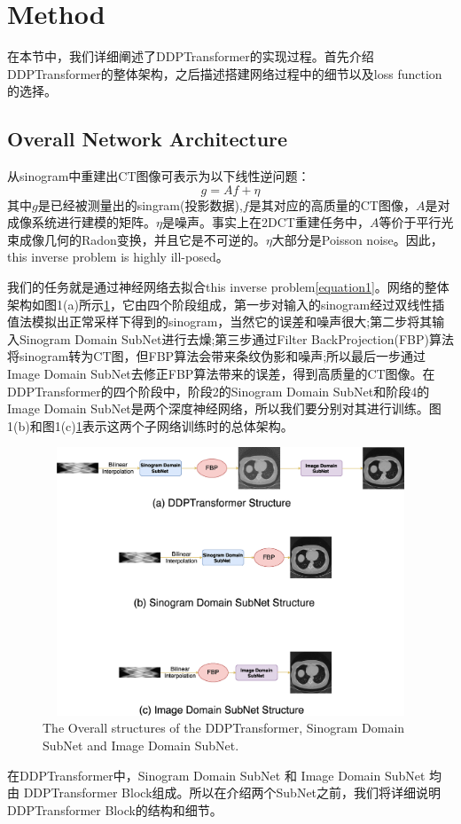 \section{Method}
在本节中，我们详细阐述了DDPTransformer的实现过程。首先介绍DDPTransformer的整体架构，之后描述搭建网络过程中的细节以及loss function的选择。
\subsection{Overall Network Architecture}
从sinogram中重建出CT图像可表示为以下线性逆问题：
\begin{equation}
	\label{equation1}
	g = Af+\eta
\end{equation}
其中$g$是已经被测量出的singram(投影数据),$f$是其对应的高质量的CT图像，$A$是对成像系统进行建模的矩阵。$\eta$是噪声。事实上在2DCT重建任务中，$A$等价于平行光束成像几何的Radon变换，并且它是不可逆的。$\eta$大部分是Poisson noise。因此，this inverse problem is highly ill-posed。\par
我们的任务就是通过神经网络去拟合this inverse problem\ref{equation1}。网络的整体架构如图1(a)所示\ref{fig1}，它由四个阶段组成，第一步对输入的sinogram经过双线性插值法模拟出正常采样下得到的sinogram，当然它的误差和噪声很大;第二步将其输入Sinogram Domain SubNet进行去燥;第三步通过Filter BackProjection(FBP)算法将sinogram转为CT图，但FBP算法会带来条纹伪影和噪声;所以最后一步通过Image Domain SubNet去修正FBP算法带来的误差，得到高质量的CT图像。在DDPTransformer的四个阶段中，阶段2的Sinogram Domain SubNet和阶段4的Image Domain SubNet是两个深度神经网络，所以我们要分别对其进行训练。图1(b)和图1(c)\ref{fig1}表示这两个子网络训练时的总体架构。\par
\begin{figure}
	\centering
	\includegraphics[height=8cm,width=12cm]{1.eps}
	\caption{The Overall structures of the DDPTransformer, Sinogram Domain SubNet
	 and Image Domain SubNet.}
	\label{fig1}
\end{figure}
在DDPTransformer中，Sinogram Domain SubNet 和 Image Domain SubNet 均由 DDPTransformer Block组成。所以在介绍两个SubNet之前，我们将详细说明DDPTransformer Block的结构和细节。
